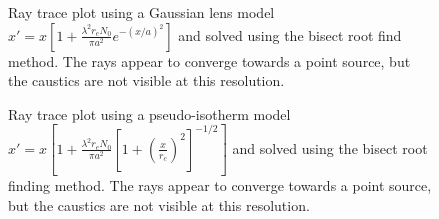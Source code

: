 \documentclass[twocolumn,11pt]{article}
\begin{document}
\begin{figure}[!h]
	\centering
	\noindent
      \caption{Ray trace plot using a Gaussian lens model $x' = x\left[1+\frac{\lambda^2r_eN_0}{\pi a^2}e^{-\left(x/a\right)^2}\right]$ and solved using the bisect root find method. The rays appear to converge towards a point source, but the caustics are not visible at this resolution.}
\end{figure}

\begin{figure}[!h]
	\centering
	\noindent
      \caption{Ray trace plot using a pseudo-isotherm model $x' = x\left[1+\frac{\lambda^2r_eN_0}{\pi a^2}\left[1+\left(\frac{x}{r_c}\right)^2\right]^{-1/2}\right]$ and solved using the bisect root finding method. The rays appear to converge towards a point source, but the caustics are not visible at this resolution.}
\end{figure}
\end{document}

